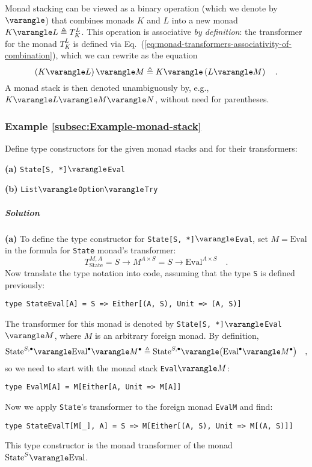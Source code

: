 Monad stacking can be viewed as a binary operation (which we denote
by $\varangle$) that combines monads $K$ and $L$ into a new monad
$K\varangle L\triangleq T_{K}^{L}$. This operation is associative
\emph{by definition}: the transformer for the monad $T_{K}^{L}$ is
defined via Eq.~(\ref{eq:monad-transformers-associativity-of-combination}),
which we can rewrite as the equation
\[
\left(K\varangle L\right)\varangle M\triangleq K\varangle\left(L\varangle M\right)\quad.
\]
 A monad stack is then denoted unambiguously by, e.g., $K\varangle L\varangle M\varangle N$,
without need for parentheses.

\subsubsection{Example \label{subsec:Example-monad-stack}\ref{subsec:Example-monad-stack}}

Define type constructors for the given monad stacks and for their
transformers:

\textbf{(a)} \lstinline!State[S, *]!$\varangle$\lstinline!Eval!

\textbf{(b)} \lstinline!List!$\varangle$\lstinline!Option!$\varangle$\lstinline!Try!

\subparagraph{Solution}

\textbf{(a)} To define the type constructor for \lstinline!State[S, *]!$\varangle$\lstinline!Eval!,
set $M=\text{Eval}$ in the formula for \lstinline!State! monad\textsf{'}s
transformer:
\[
T_{\text{State}}^{M,A}=S\rightarrow M^{A\times S}=S\rightarrow\text{Eval}^{A\times S}\quad.
\]
Now translate the type notation into code, assuming that the type
\lstinline!S! is defined previously:
\begin{lstlisting}
type StateEval[A] = S => Either[(A, S), Unit => (A, S)]
\end{lstlisting}

The transformer for this monad is denoted by \lstinline!State[S, *]!$\varangle$\lstinline!Eval!$\varangle M$,
where $M$ is an arbitrary foreign monad. By definition, 
\[
\text{State}^{S,\bullet}\varangle\text{Eval}^{\bullet}\varangle M^{\bullet}\triangleq\text{State}^{S,\bullet}\varangle\big(\text{Eval}^{\bullet}\varangle M^{\bullet}\big)\quad,
\]
so we need to start with the monad stack \lstinline!Eval!$\varangle M$:
\begin{lstlisting}
type EvalM[A] = M[Either[A, Unit => M[A]]
\end{lstlisting}
Now we apply \lstinline!State!\textsf{'}s transformer to the foreign monad
\lstinline!EvalM! and find:
\begin{lstlisting}
type StateEvalT[M[_], A] = S => M[Either[(A, S), Unit => M[(A, S)]]
\end{lstlisting}
This type constructor is the monad transformer of the monad $\text{State}^{S}\varangle\text{Eval}$.

